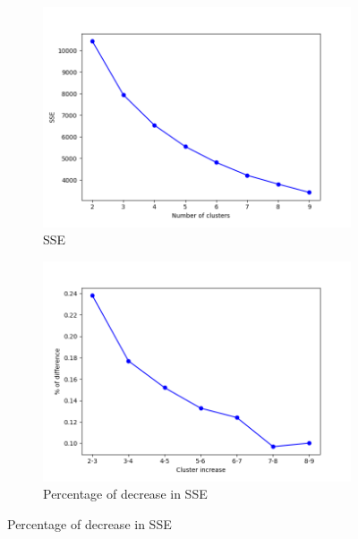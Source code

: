 \begin{figure}[h!]
     \centering
     \begin{subfigure}{0.49\textwidth}
         \centering
         \includegraphics[scale=0.4]{img/clust_1/sse.png}
         \caption{SSE}
         \label{fig:sse_img}
     \end{subfigure}
     \begin{subfigure}{0.49\textwidth}
         \centering
         \includegraphics[scale=0.4]{img/clust_1/perc.png}
         \caption{Percentage of decrease in SSE}
         \label{fig:pdiff_img}
     \end{subfigure}
     

\end{figure}
